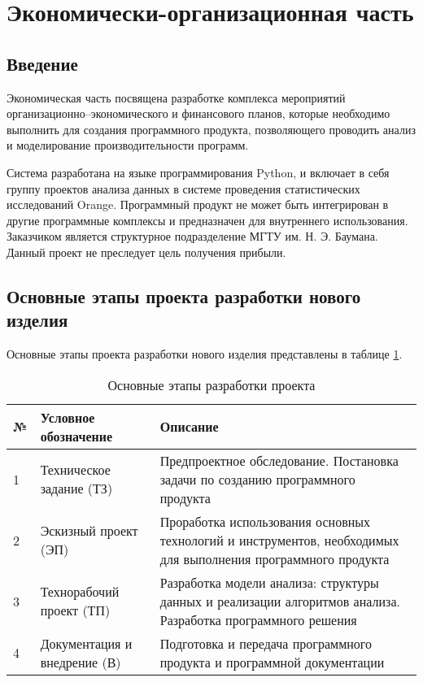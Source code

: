 \section{Экономически-организационная часть}
\subsection{Введение}
Экономическая часть посвящена разработке комплекса мероприятий организационно–экономического и финансового планов, которые необходимо выполнить для создания программного продукта, позволяющего проводить анализ и моделирование производительности программ.

Система разработана на языке программирования Python, и включает в себя группу проектов анализа данных в системе проведения статистических исследований Orange. Программный продукт не может быть интегрирован в другие программные комплексы и предназначен для внутреннего использования. Заказчиком является структурное подразделение МГТУ им. Н. Э. Баумана.
Данный проект не преследует цель получения прибыли.

\subsection{Основные этапы проекта разработки нового изделия}
Основные этапы проекта разработки нового изделия представлены в таблице \ref{tab:development-stages}.

\begin{table}[H]
    \caption{\label{tab:development-stages}Основные этапы разработки проекта}
    \begin{tabular}[H]{|l|p{5cm}|p{8cm}|}
        \hline
        № & Условное обозначение & Описание\\
        \hline
        1 & Техническое задание (ТЗ) & Предпроектное обследование. Постановка задачи по созданию программного продукта\\
        \hline
        2 & Эскизный проект (ЭП) & Проработка использования основных технологий и инструментов, необходимых для выполнения программного продукта\\
        \hline
        3 & Технорабочий проект (ТП) & Разработка модели анализа: структуры данных и реализации алгоритмов анализа. Разработка программного решения\\
        \hline
        4 & Документация и внедрение (В) & Подготовка и передача программного продукта и программной документации\\
        \hline
    \end{tabular}
\end{table}
